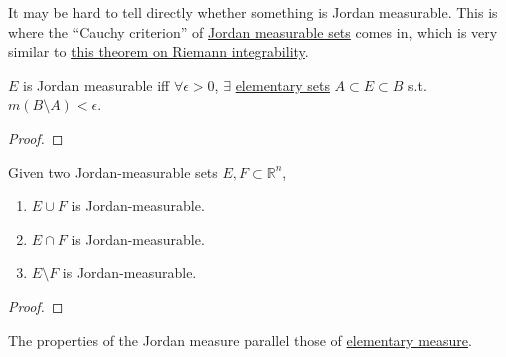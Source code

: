  It may be hard to tell directly whether something is Jordan measurable. This is where the ``Cauchy criterion'' of \hyperref[def:jordan-measurable-set-jordan-measure]{Jordan measurable sets} comes in, which is very similar to \hyperref[real-thm:cauchy-riemann-integrability]{this theorem on Riemann integrability}. 

  \begin{theorem}
    \label{thm:cauchy-criterion-of-jordan-measurability}
    $E$ is Jordan measurable iff $\forall \epsilon > 0$, $\exists$ \hyperref[def:elementary-set]{elementary sets} $A \subset E \subset B$ s.t. $m(B \setminus A) < \epsilon$. 
  \end{theorem}
  \begin{proof}
    
  \end{proof}

  \begin{lemma}
    \label{thm:boolean-closure-of-jordan-measurable-sets}
    Given two Jordan-measurable sets $E, F \subset \mathbb{R}^n$, 
    \begin{enumerate}
      \item $E \cup F$ is Jordan-measurable. 
      \item $E \cap F$ is Jordan-measurable. 
      \item $E \setminus F$ is Jordan-measurable. 
    \end{enumerate}
  \end{lemma}
  \begin{proof}
    
  \end{proof}

  The properties of the Jordan measure parallel those of \hyperref[def:elementary-measure]{elementary measure}. 

